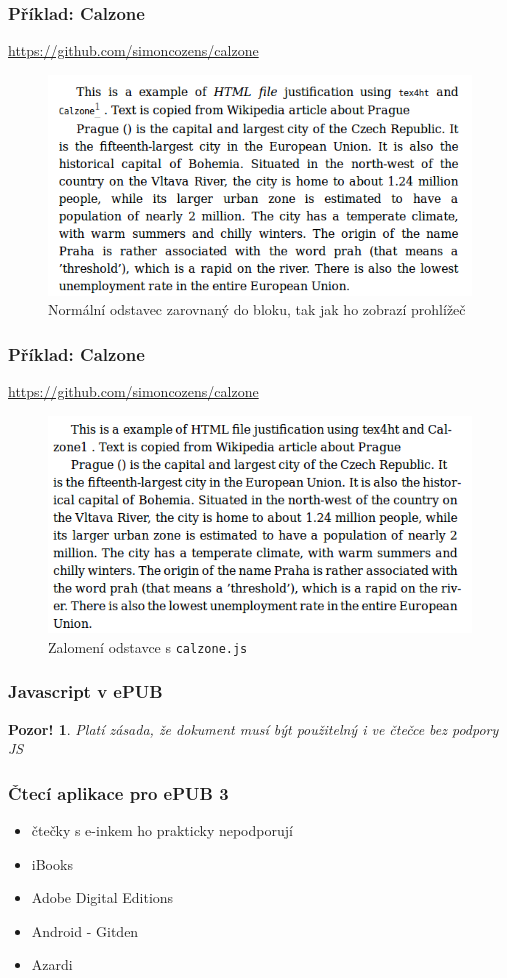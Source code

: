 \documentclass[czech]{beamer}
\newtheorem{pozor}{Pozor!}
\begin{document}
\begin{frame}
        \frametitle{Příklad: Calzone }
\url{https://github.com/simoncozens/calzone}
\begin{figure}
  \includegraphics[width=.6\textwidth]{examples/without-calzone.png.png}
  \caption{Normální odstavec zarovnaný do bloku, tak jak ho zobrazí prohlížeč}
\end{figure}
\end{frame}
\begin{frame}
        \frametitle{Příklad: Calzone }
\url{https://github.com/simoncozens/calzone}
\begin{figure}
  \includegraphics[width=.6\textwidth]{examples/with-calzone.png}
  \caption{Zalomení odstavce s \texttt{calzone.js}}
  \end{figure}
\end{frame}
\begin{frame}
  \frametitle{Javascript v ePUB}
\begin{pozor}
        Platí zásada, že dokument musí být použitelný i ve čtečce bez podpory JS
      \end{pozor}
\end{frame}
\begin{frame}
  \frametitle{Čtecí aplikace pro ePUB 3}
  \begin{itemize}
  \item čtečky s e-inkem ho prakticky nepodporují
  \item iBooks
  \item Adobe Digital Editions
  \item Android - Gitden
  \item Azardi
\end{itemize}
\end{frame}
\end{document}
